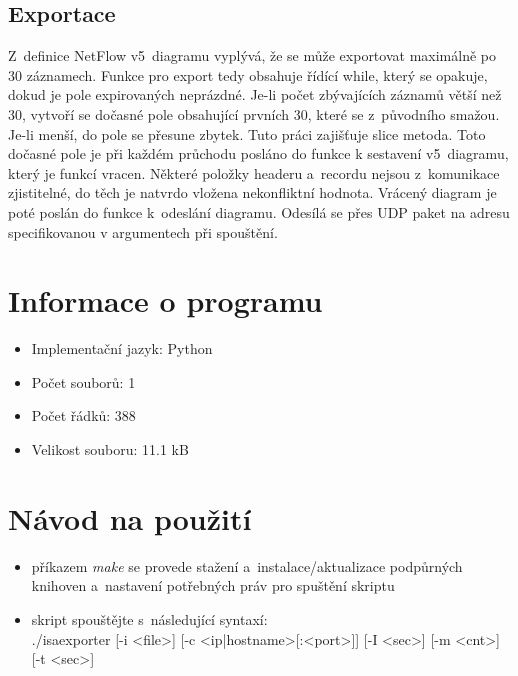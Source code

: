 \documentclass[12pt,a4paper,titlepage]{extarticle}
\begin{document}
\subsection{Exportace}
Z~definice NetFlow v5~diagramu vyplývá, že se může exportovat maximálně po 30 záznamech. Funkce pro export tedy obsahuje řídící while, který se opakuje, dokud je pole expirovaných neprázdné. Je-li počet zbývajících záznamů větší než 30, vytvoří se dočasné pole obsahující prvních 30, které se z~původního smažou. Je-li menší, do pole se přesune zbytek. Tuto práci zajišťuje slice metoda. Toto dočasné pole je při každém průchodu posláno do funkce k sestavení v5~diagramu, který je funkcí vracen. Některé položky headeru a~recordu nejsou z~komunikace zjistitelné, do těch je natvrdo vložena nekonfliktní hodnota. Vrácený diagram je poté poslán do funkce k~odeslání diagramu. Odesílá se přes UDP paket na adresu specifikovanou v argumentech při spouštění.
\pagebreak

\section{Informace o programu}
\begin{itemize}[noitemsep]
	\item Implementační jazyk: Python
	\item Počet souborů: 1
	\item Počet řádků: 388
	\item Velikost souboru: 11.1 kB
\end{itemize}

\section{Návod na použití}
\begin{itemize}[noitemsep]
	\item příkazem \emph{make} se provede stažení a~instalace/aktualizace podpůrných knihoven a~nastavení potřebných práv pro spuštění skriptu
	\item skript spouštějte s~následující syntaxí: \\./isaexporter [-i <file>] [-c <ip|hostname>[:<port>]] [-I <sec>] [-m <cnt>] [-t <sec>]
\end{itemize}
\end{document}
